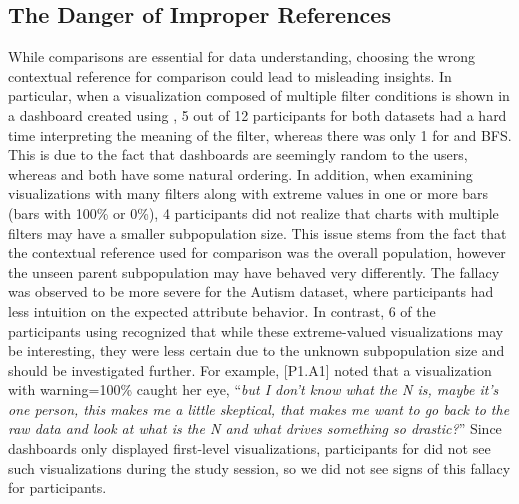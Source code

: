 \subsection{The Danger of Improper References}
\par While comparisons are essential for data understanding, choosing the wrong contextual reference for comparison could lead to misleading insights. In particular, when a visualization composed of multiple filter conditions is shown in a dashboard created using \cluster, 5 out of 12 participants for both datasets had a hard time interpreting the meaning of the filter, whereas there was only 1 for \system and BFS. This is due to the fact that \cluster dashboards are seemingly random to the users, whereas \BFS and \system both have some natural ordering. In addition, when examining visualizations with many filters along with extreme values in one or more bars (bars with 100\% or 0\%), 4 \cluster participants did not realize that charts with multiple filters may have a smaller subpopulation size. This issue stems from the fact that the contextual reference used for comparison was the overall population, however the unseen parent subpopulation may have behaved very differently. The fallacy was observed to be more severe for the Autism dataset, where participants had less intuition on the expected attribute behavior. In contrast, 6 of the participants using \system recognized that while these extreme-valued visualizations may be interesting, they were less certain due to the unknown subpopulation size and should be investigated further. For example, [P1.A1] noted that a visualization with warning=100\% caught her eye, ``\textit{but I don't know what the N is, maybe it's one person, this makes me a little skeptical, that makes me want to go back to the raw data and look at what is the N and what drives something so drastic?}'' Since \BFS dashboards only displayed first-level visualizations, participants for \BFS did not see such visualizations during the study session, so we did not see signs of this fallacy for \BFS participants.

